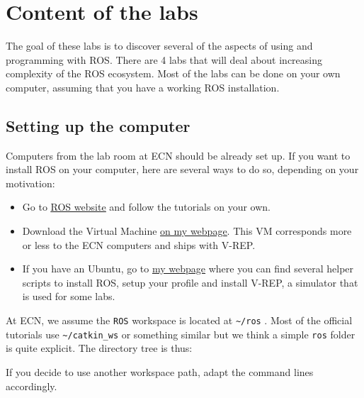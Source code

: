 \documentclass{ecnreport}
\author{G. Garcia, O. Kermorgant}
\newcommand{\link}[2]
{{\href{#1}{\color{blue}\underline{{#2}}}}}
\newcommand{\ttt}[1]
{
{\tt{#1}}
}
\begin{document}

\section*{Content of the labs}

The goal of these labs is to discover several of the aspects of using and programming with ROS. 
There are 4 labs that will deal about increasing complexity of the ROS ecosystem. Most of the labs can be done on your 
own computer, assuming that you have a working ROS installation. 

\subsection*{Setting up the computer}

Computers from the lab room at ECN should be already set up. If you want to install ROS on your computer,
here are several ways to do so, depending on your motivation:
\begin{itemize}
 \item Go to \link{www.ros.org}{ROS website} and follow the tutorials on your own.
 \item Download the Virtual Machine \link{http://pagesperso.ls2n.fr/\~kermorgant-o/coding\%20tools.html\#vm}{on my webpage}. This VM corresponds
 more or less to the ECN computers and ships with V-REP.
 \item If you have an Ubuntu, go to \link{http://pagesperso.ls2n.fr/~kermorgant-o/coding\%20tools.html\#scripts}{my webpage} where you 
 can find several helper scripts to install ROS, setup your profile and install V-REP, a simulator
 that is used for some labs. 
\end{itemize}

At ECN, we assume the \ttt{ROS} workspace is located at \ttt{\textasciitilde/ros}. Most of the official tutorials use \ttt{\textasciitilde/catkin\_ws} or something similar
but we think a simple \ttt{ros} folder is quite explicit. 
The directory tree is thus:
\begin{center}\begin{minipage}{.4\linewidth}
  \end{minipage}
\end{center}

If you decide to use another workspace path, adapt the command lines accordingly.
\end{document}

